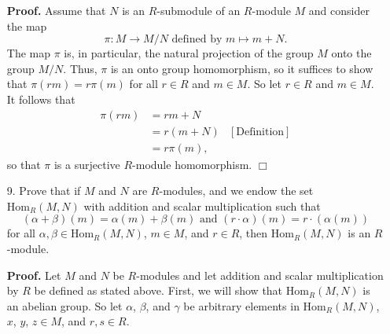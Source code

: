 \documentclass[9pt]{article}
\newcommand{\qed}{\hfill \ensuremath{\Box}}
\begin{document}
\begin{enumerate}
      \textbf{Proof.} Assume that $N$ is an $R$-submodule of an $R$-module $M$
      and consider the map
      $$\pi : M \rightarrow M/N \text{ defined by } m \mapsto m + N.$$
      The map $\pi$ is, in particular, the natural projection of the group $M$
      onto the group $M/N$. Thus, $\pi$ is an onto group homomorphism, so it
      suffices to show that $\pi(rm) = r\pi(m)$ for all $r \in R$ and $m \in M$.
      So let $r \in R$ and $m \in M$. It follows that
      \begin{align*}
         \pi(rm) &= rm + N \\
            &= r(m + N) &[\text{Definition}] \\
            &= r\pi(m),
      \end{align*}
      so that $\pi$ is a surjective $R$-module homomorphism. \qed
   \item[9.]   Prove that if $M$ and $N$ are $R$-modules, and we endow the set
               $\text{Hom}_R(M, N)$ with addition and scalar multiplication such
               that
               $$(\alpha + \beta)(m) = \alpha(m) + \beta(m) \text{ and }
                 (r \cdot \alpha)(m) = r \cdot(\alpha(m))$$
               for all $\alpha, \beta \in \text{Hom}_R(M, N)$, $m \in M$, and
               $r \in R$, then $\text{Hom}_R(M, N)$ is an $R$-module.

      \textbf{Proof.} Let $M$ and $N$ be $R$-modules and let addition and scalar
      multiplication by $R$ be defined as stated above. First, we will show that
      $\text{Hom}_R(M, N)$ is an abelian group. So let $\alpha$, $\beta$, and
      $\gamma$ be arbitrary elements in $\text{Hom}_R(M, N)$, $x$, $y$,
      $z \in M$, and $r, s \in R$.


\end{enumerate}
\end{document}
